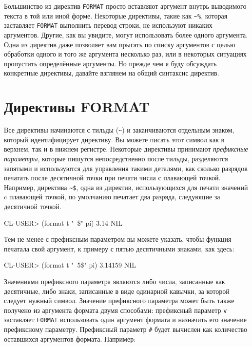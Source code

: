 Большинство из директив \lstinline{FORMAT} просто вставляют аргумент внутрь выводимого текста в
той или иной форме. Некоторые директивы, такие как \lstinline!~%!, которая заставляет
\lstinline{FORMAT} выполнить перевод строки, не используют никаких аргументов. Другие, как вы
увидите, могут использовать более одного аргумента. Одна из директив даже позволяет вам
прыгать по списку аргументов с целью обработки одного и того же аргумента несколько раз,
или в некоторых ситуациях пропустить определённые аргументы. Но прежде чем я буду
обсуждать конкретные директивы, давайте взглянем на общий синтаксис директив.

\section{Директивы FORMAT}

Все директивы начинаются с тильды (\lstinline!~!) и заканчиваются отдельным знаком, который
идентифицирует директиву. Вы можете писать этот символ как в верхнем, так и в нижнем
регистре. Некоторые директивы принимают \textit{префиксные параметры}, которые пишутся
непосредственно после тильды, разделяются запятыми и используются для управления такими
деталями, как сколько разрядов печатать после десятичной точки при печати числа с
плавающей точкой. Например, директива \lstinline!~$!, одна из директив, использующихся
для печати значений c плавающей точкой, по умолчанию печатает два разряда, следующие за
десятичной точкой.%

\begin{myverb}
CL-USER> (format t "~\$" pi)
3.14
NIL
\end{myverb}

Тем не менее с префиксным параметром вы можете указать, чтобы функция печатала свой
аргумент, к примеру с пятью десятичными знаками, как здесь:

\begin{myverb}
CL-USER> (format t "~5\$" pi)
3.14159
NIL
\end{myverb}

Значениями префиксного параметра являются либо числа, записанные как десятичные, либо
знаки, записанные в виде одинарной кавычки, за которой следует нужный символ. Значение
префиксного параметра может быть также получено из аргумента формата двумя способами:
префиксный параметр \lstinline{v} заставляет \lstinline{FORMAT} использовать один аргумент формата и
назначить его значение префиксному параметру. Префиксный параметр \lstinline!#! будет вычислен
как количество оставшихся аргументов формата. Например:

